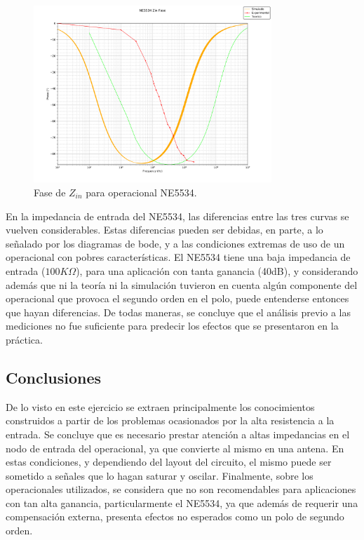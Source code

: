 \begin{figure}[H]
    \begin{minipage}{\textwidth}
        \centering
        \includegraphics[width=0.8\textwidth]{../EJ2/recursos_para_el_informe/NE5534_Zin_Fase}
        \caption{Fase de $Z_{in}$ para operacional NE5534.}
        \label{fig:NE5534_Zin_Fase}
    \end{minipage}\hfill
\end{figure}

En la impedancia de entrada del NE5534, las diferencias entre las tres curvas se vuelven considerables.
Estas diferencias pueden ser debidas, en parte, a lo señalado por los diagramas de bode, y a las condiciones extremas de uso de un operacional con pobres características.
El NE5534 tiene una baja impedancia de entrada ($100K\Omega$), para una aplicación con tanta ganancia (40dB), y considerando además que ni la teoría ni la simulación tuvieron en cuenta algún componente del operacional que provoca el segundo orden en el polo, puede entenderse entonces que hayan diferencias.
De todas maneras, se concluye que el análisis previo a las mediciones no fue suficiente para predecir los efectos que se presentaron en la práctica.



\subsection{Conclusiones}
De lo visto en este ejercicio se extraen principalmente los conocimientos construidos a partir de los problemas ocasionados por la alta resistencia a la entrada.
Se concluye que es necesario prestar atención a altas impedancias en el nodo de entrada del operacional, ya que convierte al mismo en una antena.
En estas condiciones, y dependiendo del layout del circuito, el mismo puede ser sometido a señales que lo hagan saturar y oscilar.
Finalmente, sobre los operacionales utilizados, se considera que no son recomendables para aplicaciones con tan alta ganancia, particularmente el NE5534, ya que además de requerir una compensación externa, presenta efectos no esperados como un polo de segundo orden.
